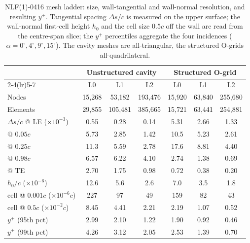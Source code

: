 \documentclass[journal]{new-aiaa}
\begin{document}
\begin{table}[tp]
  \centering
  \small
  \caption{NLF(1)-0416 mesh ladder: size, wall-tangential and wall-normal
  resolution, and resulting $y^+$. Tangential spacing $\Delta s/c$ is measured on
  the upper surface; the wall-normal first-cell height $h_0$ and the cell size
  $0.5c$ off the wall are read from the centre-span slice; the $y^+$ percentiles
  aggregate the four incidences ($\alpha\!=\!0^\circ,4^\circ,9^\circ,15^\circ$).
  The cavity meshes are all-triangular, the structured O-grids all-quadrilateral.}
  \label{tab:nlfmesh}
  \begin{tabular}{l cccccc}
    \toprule
    & \multicolumn{3}{c}{Unstructured cavity} & \multicolumn{3}{c}{Structured O-grid}\\
    \cmidrule(lr){2-4}\cmidrule(lr){5-7}
    & L0 & L1 & L2 & L0 & L1 & L2 \\
    \midrule
    Nodes    & 15{,}268 & 53{,}182 & 193{,}476 & 15{,}920 & 63{,}840 & 255{,}680 \\
    Elements & 29{,}855 & 105{,}481 & 385{,}665 & 15{,}721 & 63{,}441 & 254{,}881 \\
    \addlinespace
    $\Delta s/c$ @ LE ($\times10^{-3}$)      & 0.55 & 0.28 & 0.14 & 5.31 & 2.66 & 1.33 \\
    \quad @ $0.05c$                          & 5.73 & 2.85 & 1.42 & 10.5 & 5.23 & 2.61 \\
    \quad @ $0.25c$                          & 11.3 & 5.59 & 2.78 & 17.6 & 8.81 & 4.40 \\
    \quad @ $0.98c$                          & 6.57 & 6.22 & 4.10 & 2.74 & 1.38 & 0.69 \\
    \quad @ TE                               & 2.70 & 1.75 & 0.98 & 0.72 & 0.38 & 0.20 \\
    \addlinespace
    $h_0/c$ ($\times10^{-6}$)                & 12.6 & 5.6 & 2.6 & 7.0 & 3.5 & 1.8 \\
    cell @ $0.001c$ ($\times10^{-6}c$)       & 227 & 97 & 49 & 159 & 82 & 43 \\
    cell @ $0.5c$ ($\times10^{-2}c$)         & 8.45 & 4.41 & 2.21 & 2.19 & 1.07 & 0.52 \\
    \addlinespace
    $y^+$ (95th pct)                         & 2.99 & 2.10 & 1.22 & 1.90 & 0.92 & 0.46 \\
    $y^+$ (99th pct)                         & 4.26 & 3.12 & 2.05 & 2.53 & 1.39 & 0.70 \\
    \bottomrule
  \end{tabular}
\end{table}
\end{document}
